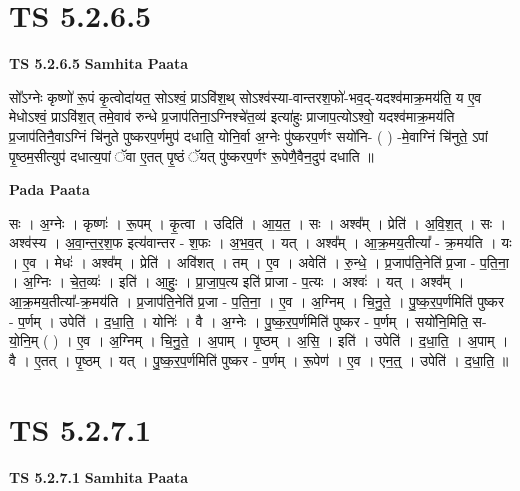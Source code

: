 \documentclass[17pt]{extarticle}
\begin{document}

\section{ TS 5.2.6.5 }

\textbf{TS 5.2.6.5 } \newline
\textbf{Samhita Paata} \newline

सो᳚ऽग्नेः कृष्णो॑ रू॒पं कृ॒त्वोदा॑यत॒ सोऽश्वं॒ प्राऽवि॑श॒थ् सोऽश्व॑स्या-वान्तरश॒फो॑-भव॒द्-यदश्व॑माक्र॒मय॑ति॒ य ए॒व मेधोऽश्वं॒ प्राऽवि॑श॒त् तमे॒वाव॑ रुन्धे प्र॒जाप॑तिना॒ऽग्निश्चे॑त॒व्य॑ इत्या॑हुः प्राजाप॒त्योऽश्वो॒ यदश्व॑माक्र॒मय॑ति प्र॒जाप॑तिनै॒वाऽग्निं चि॑नुते पुष्करप॒र्णमुप॑ दधाति॒ योनि॒र्वा अ॒ग्नेः पु॑ष्करप॒र्णꣳ सयो॑नि- ( ) -मे॒वाग्निं चि॑नुते॒ ऽपां पृ॒ष्ठम॒सीत्युप॑ दधात्य॒पां ॅवा ए॒तत् पृ॒ष्ठं ॅयत् पु॑ष्करप॒र्णꣳ रू॒पेणै॒वैन॒दुप॑ दधाति ॥ \newline

\textbf{Pada Paata} \newline

सः । अ॒ग्नेः । कृष्णः॑ । रू॒पम् । कृ॒त्वा । उदिति॑ । आ॒य॒त॒ । सः । अश्व᳚म् । प्रेति॑ । अ॒वि॒श॒त् । सः । अश्व॑स्य । अ॒वा॒न्त॒र॒श॒फ इत्य॑वान्तर - श॒फः । अ॒भ॒व॒त् । यत् । अश्व᳚म् । आ॒क्र॒मय॒तीत्या᳚ - क्र॒मय॑ति । यः । ए॒व । मेधः॑ । अश्व᳚म् । प्रेति॑ । अवि॑शत् । तम् । ए॒व । अवेति॑ । रु॒न्धे॒ । प्र॒जाप॑ति॒नेति॑ प्र॒जा - प॒ति॒ना॒ । अ॒ग्निः । चे॒त॒व्यः॑ । इति॑ । आ॒हुः॒ । प्रा॒जा॒प॒त्य इति॑ प्राजा - प॒त्यः । अश्वः॑ । यत् । अश्व᳚म् । आ॒क्र॒मय॒तीत्या᳚-क्र॒मय॑ति । प्र॒जाप॑ति॒नेति॑ प्र॒जा - प॒ति॒ना॒ । ए॒व । अ॒ग्निम् । चि॒नु॒ते॒ । पु॒ष्क॒र॒प॒र्णमिति॑ पुष्कर - प॒र्णम् । उपेति॑ । द॒धा॒ति॒ । योनिः॑ । वै । अ॒ग्नेः । पु॒ष्क॒र॒प॒र्णमिति॑ पुष्कर - प॒र्णम् । सयो॑नि॒मिति॒ स-यो॒नि॒म् ( ) । ए॒व । अ॒ग्निम् । चि॒नु॒ते॒ । अ॒पाम् । पृ॒ष्ठम् । अ॒सि॒ । इति॑ । उपेति॑ । द॒धा॒ति॒ । अ॒पाम् । वै । ए॒तत् । पृ॒ष्ठम् । यत् । पु॒ष्क॒र॒प॒र्णमिति॑ पुष्कर - प॒र्णम् । रू॒पेण॑ । ए॒व । एन॒त्॒ । उपेति॑ । द॒धा॒ति॒ ॥  \newline





\section{ TS 5.2.7.1 }

\textbf{TS 5.2.7.1 } \newline
\textbf{Samhita Paata} \newline
\end{document}
